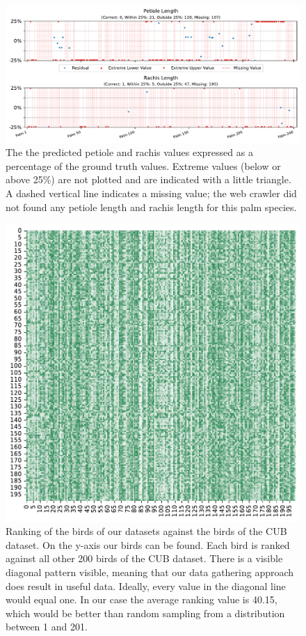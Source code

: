 \documentclass[a4paper, 12pt, oneside]{book} %
\begin{document}
\begin{figure}[htpb]
    \centering
    \includegraphics[width=1\textwidth]{figures/petioleANDrachis_values.pdf}
    \caption[Petiole and rachis values ground truth vs predicted]{The the predicted petiole and rachis values expressed as a percentage of the ground truth values. Extreme values (below or above 25\%) are not plotted and are indicated with a little triangle. A dashed vertical line indicates a missing value; the web crawler did not found any petiole length and rachis length for this palm species.}
    \label{fig:petioleANDrachis_values}
\end{figure}


\begin{figure}[htpb]
    \centering
    \includegraphics[width=1\textwidth]{figures/bird_ranking_v4.pdf}
    \caption[Ranking of our birds against CUB birds]{Ranking of the birds of our datasets against the birds of the CUB dataset. On the y-axis our birds can be found. Each bird is ranked against all other 200 birds of the CUB dataset. There is a visible diagonal pattern visible, meaning that our data gathering approach does result in useful data. Ideally, every value in the diagonal line would equal one. In our case the average ranking value is 40.15, which would be better than random sampling from a distribution between 1 and 201.}
    \label{fig:bird_ranking}
\end{figure}
\end{document}
